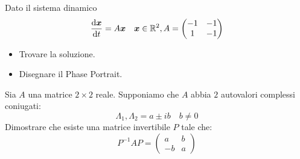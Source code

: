 \begin{ex}
    Dato il sistema dinamico 
    \[
	\frac{\text{d} \boldsymbol{x}}{\text{d} t} = A\boldsymbol{x}  \quad \boldsymbol{x}\in \mathbb{R}^2, A = \begin{pmatrix} -1 & -1 \\ 1 & - 1 \end{pmatrix} 
    \] 
    \begin{itemize}
        \item Trovare la soluzione.
	\item Disegnare il Phase Portrait.
    \end{itemize}
\end{ex}
\noindent
\begin{ex}[]
    Sia $A$ una matrice $2\times 2$ reale. Supponiamo che $A$ abbia $2$ autovalori complessi coniugati: 
    \[
        \Lambda_1, \Lambda_2 = a \pm ib \quad b\neq 0
    \] 
    Dimostrare che esiste una matrice invertibile $P$ tale che:
    \[
	P^{-1}AP = \begin{pmatrix} a & b \\ -b & a \end{pmatrix} 
    \] 
\end{ex}
\noindent
